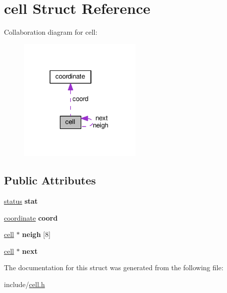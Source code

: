 \hypertarget{structcell}{\section{cell Struct Reference}
\label{structcell}
}


Collaboration diagram for cell\-:\nopagebreak
\begin{figure}[H]
\begin{center}
\leavevmode
\includegraphics[width=169pt]{structcell__coll__graph}
\end{center}
\end{figure}
\subsection*{Public Attributes}
\begin{DoxyCompactItemize}
\item 
\hypertarget{structcell_ab170fb0ebb0c01838beb95b2b2505f58}{\hyperlink{cell_8h_a015eb90e0de9f16e87bd149d4b9ce959}{status} {\bfseries stat}}\label{structcell_ab170fb0ebb0c01838beb95b2b2505f58}

\item 
\hypertarget{structcell_ad6089b3f9838a549e0664db6ad4d77cb}{\hyperlink{structcoordinate}{coordinate} {\bfseries coord}}\label{structcell_ad6089b3f9838a549e0664db6ad4d77cb}

\item 
\hypertarget{structcell_ad74bc65d9825fe95f7b0f31eae74ef9b}{\hyperlink{structcell}{cell} $\ast$ {\bfseries neigh} \mbox{[}8\mbox{]}}\label{structcell_ad74bc65d9825fe95f7b0f31eae74ef9b}

\item 
\hypertarget{structcell_a99a5ca970a81fe153b1007165617e066}{\hyperlink{structcell}{cell} $\ast$ {\bfseries next}}\label{structcell_a99a5ca970a81fe153b1007165617e066}

\end{DoxyCompactItemize}


The documentation for this struct was generated from the following file\-:\begin{DoxyCompactItemize}
\item 
include/\hyperlink{cell_8h}{cell.\-h}\end{DoxyCompactItemize}
